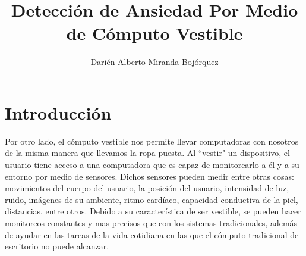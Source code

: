 \documentclass[letterpaper,12pt]{cicese}
\begin{document}
	\doublespace
	\title{Detecci\'on de Ansiedad Por Medio de C\'omputo Vestible}
	\author{Dari\'en Alberto Miranda Boj\'orquez}
	\maketitle
	\newpage
	\tableofcontents
	\newpage

		\chapter{Introducci\'on} 
			
			

			Por otro lado, el c\'omputo vestible nos permite llevar computadoras con nosotros de la misma manera que llevamos la ropa puesta. Al ``vestir" un dispositivo,
			el usuario tiene acceso a una computadora que es capaz de monitorearlo a \'el y a su entorno por medio de sensores. Dichos sensores pueden medir entre
			otras cosas: movimientos del cuerpo del usuario, la posici\'on del usuario, intensidad de luz, ruido, im\'agenes de su ambiente, ritmo card\'iaco, capacidad
			conductiva de la piel, distancias, entre otros. Debido a su caracter\'istica de ser vestible, se pueden hacer monitoreos constantes y mas precisos que con
			los sistemas tradicionales, adem\'as de ayudar en las tareas de la vida cotidiana en las que el c\'omputo tradicional de escritorio no puede alcanzar.
\end{document}

